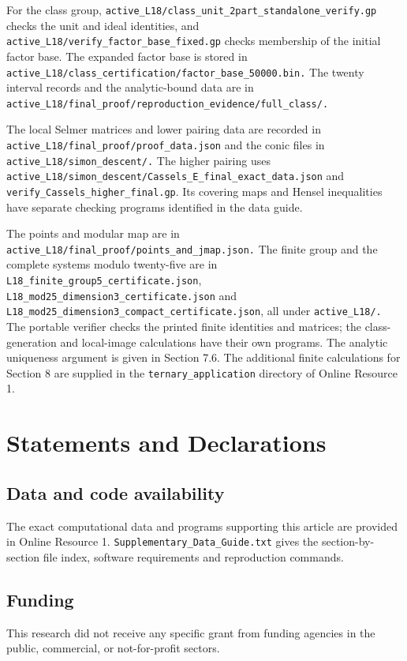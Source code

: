 \documentclass[11pt,a4paper]{article}
\theoremstyle{definition}\newtheorem{definition}[theorem]{Definition}
\theoremstyle{remark}\newtheorem{remark}[theorem]{Remark}
\newcommand{\file}[1]{\texttt{\nolinkurl{#1}}}
\begin{document}
For the class group, \file{active_L18/class_unit_2part_standalone_verify.gp} checks the unit and ideal identities, and \file{active_L18/verify_factor_base_fixed.gp} checks membership of the initial factor base. The expanded factor base is stored in \file{active_L18/class_certification/factor_base_50000.bin.} The twenty interval records and the analytic-bound data are in \file{active_L18/final_proof/reproduction_evidence/full_class/.}

The local Selmer matrices and lower pairing data are recorded in \file{active_L18/final_proof/proof_data.json} and the conic files in \file{active_L18/simon_descent/.} The higher pairing uses \file{active_L18/simon_descent/Cassels_E_final_exact_data.json} and \file{verify_Cassels_higher_final.gp}. Its covering maps and Hensel inequalities have separate checking programs identified in the data guide.

The points and modular map are in \file{active_L18/final_proof/points_and_jmap.json.} The finite group and the complete systems modulo twenty-five are in \file{L18_finite_group5_certificate.json}, \file{L18_mod25_dimension3_certificate.json} and \file{L18_mod25_dimension3_compact_certificate.json}, all under \file{active_L18/.} The portable verifier checks the printed finite identities and matrices; the class-generation and local-image calculations have their own programs. The analytic uniqueness argument is given in Section 7.6. The additional finite calculations for Section 8 are supplied in the \file{ternary_application} directory of Online Resource 1.

\section*{Statements and Declarations}
\subsection*{Data and code availability}
The exact computational data and programs supporting this article are provided in Online Resource 1. \file{Supplementary_Data_Guide.txt} gives the section-by-section file index, software requirements and reproduction commands.

\subsection*{Funding}
This research did not receive any specific grant from funding agencies in the public, commercial, or not-for-profit sectors.
\end{document}
